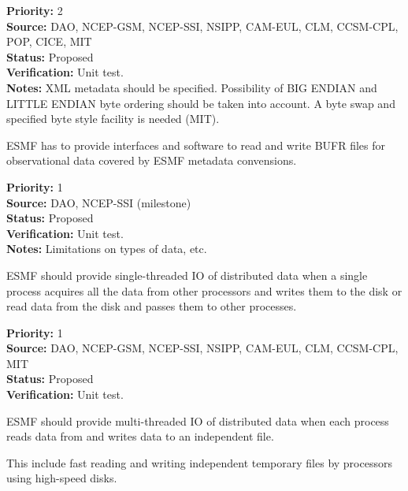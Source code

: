 \begin{reqlist}
{\bf Priority:} 2 \\
{\bf Source:} DAO, NCEP-GSM, NCEP-SSI, NSIPP, CAM-EUL, CLM, CCSM-CPL, POP, CICE, MIT \\
{\bf Status:} Proposed \\
{\bf Verification:} Unit test. \\
{\bf Notes:} XML metadata should be specified. Possibility of BIG
ENDIAN and LITTLE ENDIAN byte ordering should be taken into account.
A byte swap and specified byte style facility is needed (MIT).
\end{reqlist}



ESMF has to provide interfaces and software to read and write BUFR files for
observational data covered by ESMF metadata convensions.

\begin{reqlist}
{\bf Priority:} 1 \\
{\bf Source:} DAO, NCEP-SSI (milestone) \\
{\bf Status:} Proposed \\
{\bf Verification:} Unit test. \\
{\bf Notes:} Limitations on types of data, etc.
\end{reqlist}





ESMF should provide single-threaded IO of distributed data when a
single process acquires all the data from other processors and writes
them to the disk or read data from the disk and passes them to other 
processes. 


\begin{reqlist}
{\bf Priority:} 1 \\
{\bf Source:} DAO, NCEP-GSM, NCEP-SSI, NSIPP, CAM-EUL, CLM, CCSM-CPL, MIT \\
{\bf Status:} Proposed \\
{\bf Verification:} Unit test.
\end{reqlist}




ESMF should provide multi-threaded IO of distributed data when each
process reads data from and writes data to an independent file. 

This include fast reading and writing independent temporary files by 
processors using high-speed disks.

